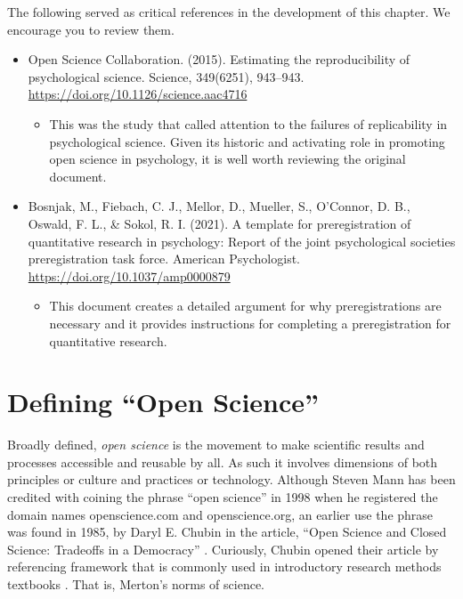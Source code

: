 \documentclass[
  11pt,
]{book}
\providecommand{\tightlist}{%
  \setlength{\itemsep}{0pt}\setlength{\parskip}{0pt}}
\begin{document}
The following served as critical references in the development of this chapter. We encourage you to review them.

\begin{itemize}
\tightlist
\item
  Open Science Collaboration. (2015). Estimating the reproducibility of psychological science. Science, 349(6251), 943--943. \url{https://doi.org/10.1126/science.aac4716}

  \begin{itemize}
  \tightlist
  \item
    This was the study that called attention to the failures of replicability in psychological science. Given its historic and activating role in promoting open science in psychology, it is well worth reviewing the original document.
  \end{itemize}
\item
  Bosnjak, M., Fiebach, C. J., Mellor, D., Mueller, S., O'Connor, D. B., Oswald, F. L., \& Sokol, R. I. (2021). A template for preregistration of quantitative research in psychology: Report of the joint psychological societies preregistration task force. American Psychologist. \url{https://doi.org/10.1037/amp0000879}

  \begin{itemize}
  \tightlist
  \item
    This document creates a detailed argument for why preregistrations are necessary and it provides instructions for completing a preregistration for quantitative research.
  \end{itemize}
\end{itemize}

\hypertarget{defining-open-science}{%
\section{Defining ``Open Science''}\label{defining-open-science}}

Broadly defined, \emph{open science} is the movement to make scientific results and processes accessible and reusable by all. As such it involves dimensions of both principles or culture and practices or technology. Although Steven Mann has been credited with coining the phrase ``open science'' in 1998 when he registered the domain names openscience.com and openscience.org, an earlier use the phrase was found in 1985, by Daryl E. Chubin in the article, ``Open Science and Closed Science: Tradeoffs in a Democracy'' \citep{noauthor_open_2022}. Curiously, Chubin opened their article by referencing framework that is commonly used in introductory research methods textbooks \citep[e.g.,][]{krathwohl_methods_2009}. That is, Merton's norms of science.
\end{document}
